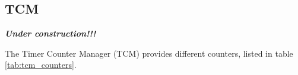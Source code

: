 % 
% 
% 
% 
% 
%
%
\subsection{TCM}\label{sec:tcm}
\textbf{\textit{Under construction!!!}}

The Timer Counter Manager (TCM) provides different counters, listed in table \ref{tab:tcm_counters}.

